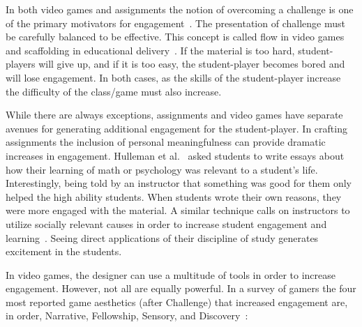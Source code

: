 \documentclass{sig-alternate-05-2015}
\begin{document}
In both video games and assignments the notion of overcoming a challenge is one of the primary motivators for engagement~\cite{ryan06motivational}. The presentation of challenge must be carefully balanced to be effective. This concept is called flow in video games and scaffolding in educational delivery~\cite{cs90flow}. If the material is too hard, student-players will give up, and if it is too easy, the student-player becomes bored and will lose engagement. In both cases, as the skills of the student-player increase the difficulty of the class/game must also increase.



While there are always exceptions, assignments and video games have separate avenues for generating additional engagement for the student-player. In crafting assignments the inclusion of personal meaningfulness can provide dramatic increases in engagement. Hulleman et al.~\cite{hulleman10enhancing} asked students to write essays about how their learning of math or psychology was relevant to a student's life. Interestingly, being told by an instructor that something was good for them only helped the high ability students. When students wrote their own reasons, they were more engaged with the material. A similar technique calls on instructors to utilize socially relevant causes in order to increase student engagement and learning~\cite{buckley08socially}. Seeing direct applications of their discipline of study generates excitement in the students.



In video games, the designer can use a multitude of tools in order to increase engagement. However, not all are equally powerful. In a survey of gamers the four most reported game aesthetics (after Challenge) that increased engagement are, in order, Narrative, Fellowship, Sensory, and Discovery~\cite{schoenau-fog11player}:
\end{document}
